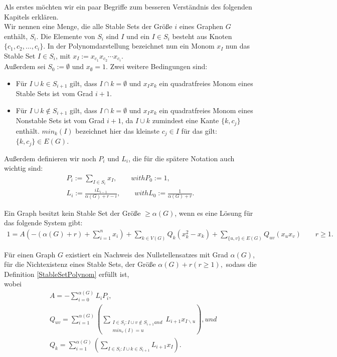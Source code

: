 Als erstes möchten wir ein paar Begriffe zum besseren Verständnis des folgenden Kapitels erklären.\\
Wir nennen eine Menge, die alle Stable Sets der Größe $i$ eines Graphen $G$ enthält, $S_i$. Die Elemente von $S_i$ sind $I$ und ein $I \in S_i$ besteht aus Knoten $\{c_1,c_2,\ldots,c_i\}$. In der Polynomdarstellung bezeichnet nun ein Monom $x_I$ nun das Stable Set $I \in S_i$, mit $x_I := x_{c_1}x_{c_2}\cdots x_{c_i}$.\\
Außerdem sei $S_0 := \emptyset$ und $x_{\emptyset} = 1$. Zwei weitere Bedingungen sind:
\begin{itemize}
\item Für $I \cup k \in S_{i+1}$ gilt, dass $I \cap k = \emptyset$ und $x_Ix_k$ ein quadratfreies Monom eines Stable Sets ist vom Grad $i+1$. 
\item Für $I \cup k \notin S_{i+1}$ gilt, dass $I \cap k = \emptyset$ und $x_Ix_k$ ein quadratfreies Monom eines Nonstable Sets ist vom Grad $i+1$, da $I \cup k$ zumindest eine Kante $\{k,c_j\}$ enthält. $min_k(I)$ bezeichnet hier das kleinste $c_j \in I$ für das gilt: $\{k,c_j\} \in  E(G)$.
\end{itemize}
Außerdem definieren wir noch $P_i$ und $L_i$, die für die spätere Notation auch wichtig sind:
\begin{align*}
&P_i := \sum_{I\in S_i}x_I, \qquad with P_0 :=1,&\\
&L_i := \frac{iL_{i-1}}{\alpha(G)+r-i}, \qquad with L_0 := \frac{1}{\alpha(G)+r}.&
\end{align*}

\begin{definition} \label{StableSetPolynom}
Ein Graph besitzt kein Stable Set der Größe $\ge \alpha (G)$, wenn es eine Lösung für das folgende System gibt:
\begin{align*}
1 = A\left(-(\alpha(G) + r) + \sum_{i=1}^nx_i\right)+\sum_{k \in V(G)} Q_k(x_k^2-x_k)+\sum_{\{u,v\}\in E(G)} Q_{uv}(x_ux_v) \qquad r \ge 1. 
\end{align*}
\end{definition}

\begin{theorem}
Für einen Graph $G$ existiert ein Nachweis des Nullstellensatzes mit Grad $\alpha(G)$, für die Nichtexistenz eines Stable Sets, der Größe $\alpha(G) +r (r\ge 1), $ sodass die Definition \ref{StableSetPolynom} erfüllt ist, \\
wobei 
\begin{align*}
& A = - \sum_{i=0}^{\alpha(G)}L_iP_i,\\
& Q_{uv} = \sum_{i=1}^{\alpha(G)} \left( \sum_{\substack{I \in S_i: I \cup v \notin S_{i+1} and  \\ min_v(I)=u}}  L_{i+1}x_{I\backslash u} \right), und\\ 
& Q_k = \sum_{i=1}^{\alpha(G)}\left( \sum_{I \in S_i: I \cup k \in S_{i+1}} L_{i+1}x_I \right).
\end{align*}
\end{theorem}

